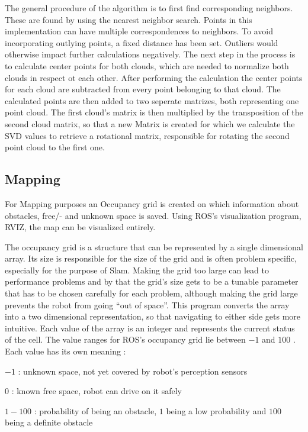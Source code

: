 \documentclass{ba-kecs}
\begin{document}
The general procedure of the algorithm is to first find corresponding neighbors. These are found by using the nearest neighbor search. Points in this implementation can have multiple correspondences to neighbors. To avoid incorporating outlying points, a fixed distance has been set. Outliers would otherwise impact further calculations negatively.
The next step in the process is to calculate center points for both clouds, which are needed to normalize both clouds in respect ot each other. After performing the calculation the center points for each cloud are subtracted from every point belonging to that cloud. The calculated points are then added to two seperate matrizes, both representing one point cloud. The first cloud's matrix is then multiplied by the transposition of the second cloud matrix, so that a new Matrix is created for which we calculate the SVD values to retrieve a rotational matrix, responsible for rotating the second point cloud to the first one.
\subsection{Mapping}\label{sec:mapping}

For Mapping purposes an Occupancy grid is created on which information about obstacles, free/- and unknown space is saved. Using ROS's visualization program, RVIZ, the map can be visualized entirely.

The occupancy grid is a structure that can be represented by a single dimensional array. Its size is responsible for the size of the grid and is often problem specific, especially for the purpose of Slam. Making the grid too large can lead to performance problems and by that the grid's size gets to be a tunable parameter that has to be chosen carefully for each problem, although making the grid large prevents the robot from going ``out of space''.
 This program converts the array into a two dimensional representation, so that navigating to either side gets more intuitive. Each value of the array is an integer and represents the current status of the cell. The value ranges for ROS's occupancy grid lie between $-1$ and $100$ \cite{occupancy}. Each value has its own meaning :

\begin{description}
\item{$-1$} : unknown space, not yet covered by robot's perception sensors
\item{$ 0$} : known free space, robot can drive on it safely
\item{$1-100$} : probability of being an obstacle, $1$ being a low probability and $100$ being a definite obstacle
\end{description}
\end{document}
